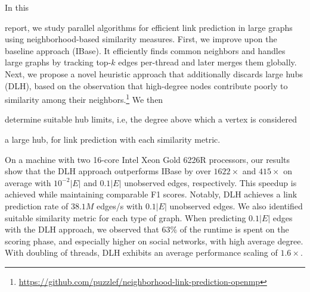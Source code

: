 In this report, we study parallel algorithms for efficient link prediction in large graphs using neighborhood-based similarity measures. First, we improve upon the baseline approach (IBase). It efficiently finds common neighbors and handles large graphs by tracking top-$k$ edges per-thread and later merges them globally. Next, we propose a novel heuristic approach that additionally discards large hubs (DLH), based on the observation that high-degree nodes contribute poorly to similarity among their neighbors.\footnote{\url{https://github.com/puzzlef/neighborhood-link-prediction-openmp}} We then determine suitable hub limits, i.e, the degree above which a vertex is considered a large hub, for link prediction with each similarity metric.

On a machine with two 16-core Intel Xeon Gold 6226R processors, our results show that the DLH approach outperforms IBase by over $1622\times$ and $415\times$ on average with $10^{-2}|E|$ and $0.1|E|$ unobserved edges, respectively. This speedup is achieved while maintaining comparable F1 scores. Notably, DLH achieves a link prediction rate of $38.1M$ edges/s with $0.1|E|$ unobserved edges. We also identified suitable similarity metric for each type of graph. When predicting $0.1|E|$ edges with the DLH approach, we observed that $63\%$ of the runtime is spent on the scoring phase, and especially higher on social networks, with high average degree. With doubling of threads, DLH exhibits an average performance scaling of $1.6\times$.







